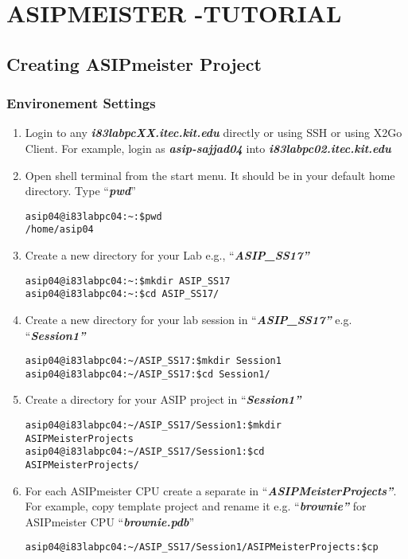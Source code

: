 \chapter*{ASIPMEISTER -TUTORIAL}
\section*{Creating ASIPmeister Project}
\subsection{Environement Settings}
\begin{enumerate}
\item Login to any \emph{\textbf{i83labpcXX.itec.kit.edu}} directly or using
	SSH or using X2Go Client. For example, login as \emph{\textbf{asip-sajjad04}} into
	\emph{\textbf{i83labpc02.itec.kit.edu}}
\item Open shell terminal from the start menu. It should be in your default
	home directory. Type ``\emph{\textbf{pwd}}''
\begin{lstlisting}
asip04@i83labpc04:~:$pwd
/home/asip04
\end{lstlisting}
\item Create a new directory for your Lab e.g., ``\emph{\textbf{ASIP\_SS17''}}
\begin{lstlisting}
asip04@i83labpc04:~:$mkdir ASIP_SS17
asip04@i83labpc04:~:$cd ASIP_SS17/
\end{lstlisting}
\item Create a new directory for your lab session in
	``\emph{\textbf{ASIP\_SS17''}} e.g. ``\emph{\textbf{Session1''}}
\begin{lstlisting}
asip04@i83labpc04:~/ASIP_SS17:$mkdir Session1
asip04@i83labpc04:~/ASIP_SS17:$cd Session1/
\end{lstlisting}
\item Create a directory for your ASIP project in ``\emph{\textbf{Session1''}}
\begin{lstlisting}
asip04@i83labpc04:~/ASIP_SS17/Session1:$mkdir
ASIPMeisterProjects
asip04@i83labpc04:~/ASIP_SS17/Session1:$cd
ASIPMeisterProjects/
\end{lstlisting}
\item For each ASIPmeister CPU create a separate in
	``\emph{\textbf{ASIPMeisterProjects''}}. For example, copy template
	project and rename it e.g. ``\emph{\textbf{brownie''}} for ASIPmeister
	CPU ``\emph{\textbf{brownie.pdb}}''
\begin{lstlisting}
asip04@i83labpc04:~/ASIP_SS17/Session1/ASIPMeisterProjects:$cp

\end{lstlisting}
\end{enumerate}

